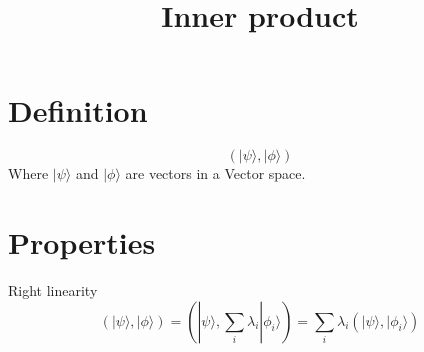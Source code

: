 \documentclass{article}
\begin{document}
\title{Inner product}

\section{Definition}
\begin{equation}
    (|\psi\rangle,|\phi\rangle)
\end{equation}
Where $|\psi\rangle$ and $|\phi\rangle$ are vectors in a Vector space.

\section{Properties}

Right linearity
\begin{equation}
    (|\psi\rangle,|\phi\rangle) = (|\psi\rangle,\sum_{i}\lambda_i|\phi_i\rangle)
        = \sum_{i}\lambda_i(|\psi\rangle,|\phi_i\rangle)
\end{equation}
\end{document}
